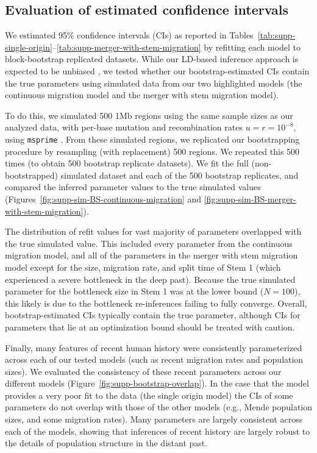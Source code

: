 \documentclass[]{article}
\begin{document}
\subsection{Evaluation of estimated confidence intervals}
\label{sec:confidence-intervals}

We estimated 95\% confidence intervals (CIs) as reported in
Tables~\ref{tab:supp-single-origin}--\ref{tab:supp-merger-with-stem-migration}
by refitting each model to block-bootstrap replicated datasets. While our
LD-based inference approach is expected to be unbiased
\citep{Ragsdale2019-nt,Ragsdale2020-nz}, we tested whether our
bootstrap-estimated CIs contain the true parameters using simulated data from
our two highlighted models (the continuous migration model and the merger with
stem migration model).

To do this, we simulated 500 1Mb regions using the same sample sizes as our
analyzed data, with per-base mutation and recombination rates $u=r=10^{-8}$,
using \texttt{msprime} \citep{Baumdicker2022-mj}. From these simulated regions,
we replicated our bootstrapping procedure by resampling (with replacement) 500
regions. We repeated this 500 times (to obtain 500 bootstrap replicate
datasets). We fit the full (non-bootstrapped) simulated dataset and each of the
500 bootstrap replicates, and compared the inferred parameter values to the
true simulated values (Figures~\ref{fig:supp-sim-BS-continuous-migration} and
\ref{fig:supp-sim-BS-merger-with-stem-migration}).

The distribution of refit values for vast majority of parameters overlapped
with the true simulated value. This included every parameter from the
continuous migration model, and all of the parameters in the merger with stem
migration model except for the size, migration rate, and split time of Stem 1
(which experienced a severe bottleneck in the deep past). Because the true
simulated parameter for the bottleneck size in Stem 1 was at the lower bound
($N=100$), this likely is due to the bottleneck re-inferences failing to
fully converge. Overall, bootstrap-estimated CIs typically contain the true
parameter, although CIs for parameters that lie at an optimization bound
should be treated with caution.

Finally, many features of recent human history were consistently parameterized
across each of our tested models (such as recent migration rates and population
sizes). We evaluated the consistency of these recent parameters across our
different models (Figure~\ref{fig:supp-bootstrap-overlap}). In the case that
the model provides a very poor fit to the data (the single origin model) the
CIs of some parameters do not overlap with those of the other models (e.g.,
Mende population sizes, and some migration rates). Many parameters are largely
consistent across each of the models, showing that inferences of recent history
are largely robust to the details of population structure in the distant past.
\end{document}
